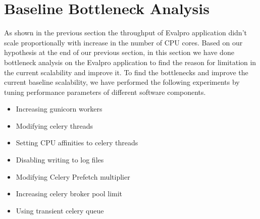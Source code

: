 \documentclass[sigconf]{acmart}
\begin{document}
\section{Baseline Bottleneck Analysis}\label{baseline_bottleneck_analysis}
As shown in the previous section the throughput of Evalpro application didn't scale proportionally with increase in the number of CPU cores. Based on our hypothesis at the end of our previous section, in this section we have done bottleneck analysis on the Evalpro application to find the reason for limitation in the current scalability and improve it. To find the bottlenecks and improve the current baseline scalability, we have performed the following experiments  by tuning performance parameters of different software components.
\begin{itemize}
    \item
    Increasing gunicorn workers
    \item
    Modifying celery threads
    \item
    Setting CPU affinities to celery threads
    \item
    Disabling writing to log files
    \item
    Modifying Celery Prefetch multiplier
    \item
    Increasing celery broker pool limit
    \item
    Using transient celery queue
\end{itemize}
\end{document}
